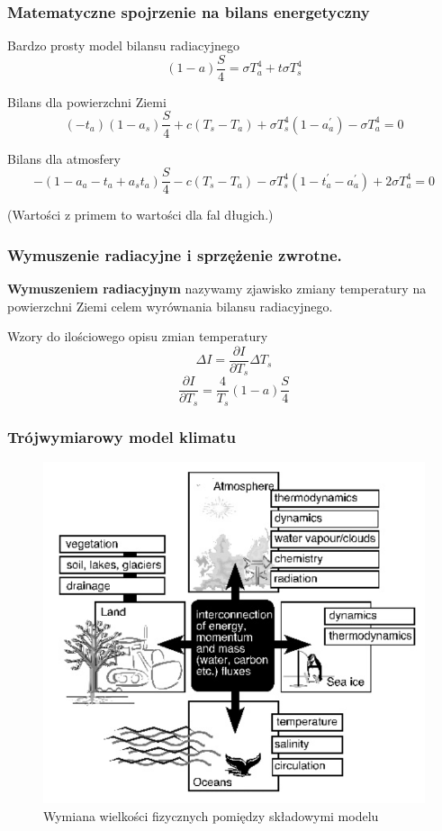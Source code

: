\documentclass{beamer}
\begin{document}
\begin{frame}
	\frametitle{Matematyczne spojrzenie na bilans energetyczny}
	\begin{block}{Bardzo prosty model bilansu radiacyjnego}
		\[(1-a)\frac{S}{4} = \sigma T_a^4 + t\sigma T_s^4
		\]
	\end{block}
	\begin{block}{Bilans dla powierzchni Ziemi}
		\[(-t_a)(1-a_s)\frac{S}{4}+c(T_s - T_a)+\sigma T_s^4(1-a_a^{'})
		-\sigma T_a^4 =0
		\]
	\end{block}
	\begin{block}{Bilans dla atmosfery}
		\[-(1- a_a-t_a+a_st_a)\frac{S}{4} - c(T_s - T_a) - \sigma T_s^4
		(1-t_a^{'}-a_a^{'}) + 2\sigma T_a^4=0
		\]
	\end{block}
	\scriptsize{(Wartości z primem to wartości dla fal długich.)}
	
\end{frame}


\begin{frame}
	\frametitle{Wymuszenie radiacyjne i sprzężenie zwrotne.}
	\textbf{Wymuszeniem radiacyjnym} nazywamy zjawisko zmiany temperatury na powierzchni Ziemi celem wyrównania bilansu radiacyjnego. 
	\begin{block}{Wzory do ilościowego opisu zmian temperatury}
		\[\Delta I = \frac{\partial I}{\partial T_s}\Delta T_s
		\]
		\[\frac{\partial I}{\partial T_s} = \frac{4}{T_s}(1-a)\frac{S}{4}
		\]
		
	\end{block}
\end{frame}


\begin{frame}
	\frametitle{Trójwymiarowy model klimatu}
	\begin{figure}[h]
		\begin{center}
			\includegraphics[width=0.6\linewidth]{images/Figure6.png}
			\caption{Wymiana wielkości fizycznych pomiędzy składowymi modelu}
		\end{center}
	\end{figure}
\end{frame}
\end{document}
